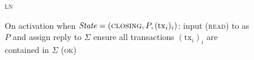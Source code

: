 \begin{figure}[H]
\begin{systembox}{\textsc{ln}}
\begin{algorithmic}[1]
      \State On activation when $\textit{State} = (\textsc{closing}, P,
      (\mathrm{tx}_i)_i)$:
      \Indent
        \State input (\textsc{read}) to \ledger as $P$ and assign reply to
        $\Sigma$
        \State ensure all transactions $(\mathrm{tx}_i)_i$ are contained in
        $\Sigma$
        \State \Return (\textsc{ok})
      \EndIndent
    \end{algorithmic}
  \end{systembox}
  \caption{}
  \label{code:ln}
\end{figure}
